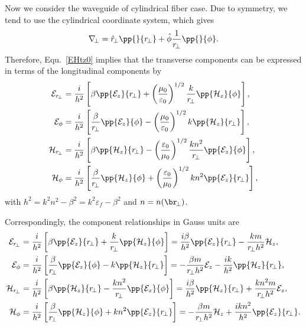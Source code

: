 Now we consider the waveguide of cylindrical fiber case. Due to symmetry, we tend to use the 
cylindrical coordinate system, which gives 
\begin{align}
\nabla\!_\perp = \hat{r}\!_\perp \pp{}{r\!_\perp} + \hat{\phi} \frac{1}{r\!_\perp} \pp{}{\phi}.
\end{align}
Therefore, Equ.~\ref{EHtz0} implies that the transverse components can be expressed in terms of the 
longitudinal components by
\begin{subequations}
\begin{align}
\mathcal{E}_{r\!_\perp} &= \frac{i}{h^2} \left[ \beta \pp{\mathcal{E}_z }{r\!_\perp} + 
\left(\frac{\mu_0}{\varepsilon_0} \right)^{1/2}  \frac{k}{r\!_\perp} 
\pp{\mathcal{H}_z}{\phi} \right], \\
\mathcal{E}_\phi &= \frac{i}{h^2} \left[\frac{\beta}{r\!_\perp} 
\pp{\mathcal{E}_z}{\phi} -\left(\frac{\mu_0}{\varepsilon_0} \right) ^{1/2} k 
\pp{\mathcal{H}_z}{r\!_\perp} 
\right],\\
\mathcal{H}_{r\!_\perp} &= \frac{i}{h^2} \left[ \beta \pp{\mathcal{H}_z}{r\!_\perp} 
-\left(\frac{\varepsilon_0}{\mu_0} \right)^{1/2} \frac{kn^2}{r\!_\perp}\pp{\mathcal{E}_z}{\phi} \right],\\
\mathcal{H}_\phi &= \frac{i}{h^2} \left[ \frac{\beta}{r\!_\perp} \pp{\mathcal{H}_z}{\phi} + 
\left(\frac{\varepsilon_0}{\mu_0} \right)^{1/2} kn^2 \pp{\mathcal{E}_z}{r\!_\perp} \right],
\end{align}
\end{subequations}
with $ h^2= k^2n^2-\beta^2=k^2 \varepsilon_f -\beta^2  $ and $ n=n(\br\!_\perp) $. 

Correspondingly, the component relationships in Gauss units are
\begin{subequations}\label{EHzgauss}
\begin{align}
\mathcal{E}_{r\!_\perp} &= \frac{i}{h^2} \left[ \beta \pp{\mathcal{E}_z }{r\!_\perp} + 
  \frac{k}{r\!_\perp} 
\pp{\mathcal{H}_z}{\phi} \right]= \frac{i\beta}{h^2} \pp{\mathcal{E}_z }{r\!_\perp} - 
  \frac{km}{r\!_\perp h^2} {\mathcal{H}_z}, \\
\mathcal{E}_\phi &= \frac{i}{h^2} \left[\frac{\beta}{r\!_\perp} 
\pp{\mathcal{E}_z}{\phi} - k 
\pp{\mathcal{H}_z}{r\!_\perp} 
\right] = -\frac{\beta m}{r\!_\perp h^2} 
{\mathcal{E}_z} - \frac{ik}{h^2} 
\pp{\mathcal{H}_z}{r\!_\perp},\\
\mathcal{H}_{r\!_\perp} &= \frac{i}{h^2} \left[ \beta \pp{\mathcal{H}_z}{r\!_\perp} 
- \frac{kn^2}{r\!_\perp}\pp{\mathcal{E}_z}{\phi} \right]= \frac{i\beta}{h^2} \pp{\mathcal{H}_z}{r\!_\perp} 
+ \frac{kn^2m}{r\!_\perp h^2} {\mathcal{E}_z},\\
\mathcal{H}_\phi &= \frac{i}{h^2} \left[ \frac{\beta}{r\!_\perp} \pp{\mathcal{H}_z}{\phi} + 
 kn^2 \pp{\mathcal{E}_z}{r\!_\perp} \right] = -\frac{\beta m}{r\!_\perp h^2} {\mathcal{H}_z} + 
  \frac{ikn^2}{h^2} \pp{\mathcal{E}_z}{r\!_\perp}.
\end{align}
\end{subequations}


